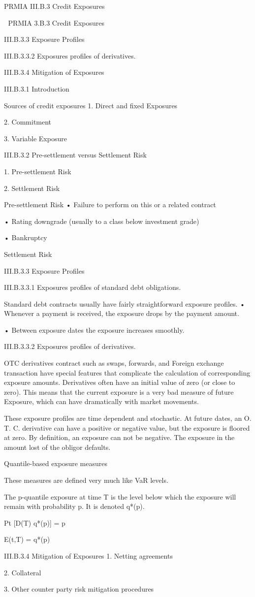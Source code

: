 
PRMIA III.B.3 Credit Exposures


PRMIA 3.B.3 Credit Exposures

III.B.3.3 Exposure Profiles

III.B.3.3.2 Exposures profiles of derivatives.

III.B.3.4 Mitigation of Exposures


III.B.3.1 Introduction


Sources of credit exposures
1.
Direct and fixed Exposures

2.
Commitment

3.
Variable Exposure




III.B.3.2 Pre-settlement versus Settlement Risk

1.
Pre-settlement Risk

2.
Settlement Risk



Pre-settlement Risk
•
Failure to perform on this or a related contract

•
Rating downgrade (usually to a class below investment grade)

•
Bankruptcy



Settlement Risk


III.B.3.3 Exposure Profiles


III.B.3.3.1 Exposures profiles of standard debt obligations.

Standard debt contracts usually have fairly straightforward exposure profiles.
•
Whenever a payment is received, the exposure drops by the payment amount.

•
Between exposure dates the exposure increases smoothly.



 

III.B.3.3.2 Exposures profiles of derivatives.

OTC derivatives contract such as swaps, forwards, and Foreign exchange transaction have special features that complicate the calculation of corresponding exposure amounts. Derivatives often have an initial value of zero (or close to zero). This means that the current exposure is a very bad measure of future Exposure, which can have dramatically with market movements.

These exposure profiles are time dependent and stochastic. At future dates, an O. T. C. derivative can have a positive or negative value, but the exposure is floored at zero. By definition, an exposure can not be negative. The exposure in the amount lost of the obligor defaults.


Quantile-based exposure measures

These measures are defined very much like VaR levels.

The p-quantile exposure at time T is the level below which the exposure will remain with probability p. It is denoted q*(p).

Pt [D(T) q*(p)] = p

E(t,T) = q*(p)


III.B.3.4 Mitigation of Exposures
1.
Netting agreements

2.
Collateral

3.
Other counter party risk mitigation procedures


